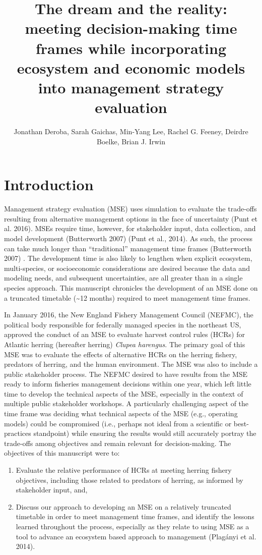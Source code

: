 \documentclass[]{article}
\title{The dream and the reality: meeting decision-making time frames while
incorporating ecosystem and economic models into management strategy
evaluation}
\author{Jonathan Deroba, Sarah Gaichas, Min-Yang Lee, Rachel G. Feeney, Deirdre
Boelke, Brian J. Irwin}
\date{}
\begin{document}
\maketitle

\doublespacing

\section{Introduction}\label{introduction}

Management strategy evaluation (MSE) uses simulation to evaluate the
trade-offs resulting from alternative management options in the face of
uncertainty (Punt et al. 2016). MSEs require time, however, for
stakeholder input, data collection, and model development (Butterworth
2007) (Punt et al., 2014). As such, the process can take much longer
than ``traditional'' management time frames (Butterworth 2007) . The
development time is also likely to lengthen when explicit ecosystem,
multi-species, or socioeconomic considerations are desired because the
data and modeling needs, and subsequent uncertainties, are all greater
than in a single species approach. This manuscript chronicles the
development of an MSE done on a truncated timetable (\textasciitilde{}12
months) required to meet management time frames.

In January 2016, the New England Fishery Management Council (NEFMC), the
political body responsible for federally managed species in the
northeast US, approved the conduct of an MSE to evaluate harvest control
rules (HCRs) for Atlantic herring (hereafter herring) \emph{Clupea
harengus}. The primary goal of this MSE was to evaluate the effects of
alternative HCRs on the herring fishery, predators of herring, and the
human environment. The MSE was also to include a public stakeholder
process. The NEFMC desired to have results from the MSE ready to inform
fisheries management decisions within one year, which left little time
to develop the technical aspects of the MSE, especially in the context
of multiple public stakeholder workshops. A particularly challenging
aspect of the time frame was deciding what technical aspects of the MSE
(e.g., operating models) could be compromised (i.e., perhaps not ideal
from a scientific or best-practices standpoint) while ensuring the
results would still accurately portray the trade-offs among objectives
and remain relevant for decision-making. The objectives of this
manuscript were to:

\begin{enumerate}
\def\labelenumi{\arabic{enumi}.}
\item
  Evaluate the relative performance of HCRs at meeting herring fishery
  objectives, including those related to predators of herring, as
  informed by stakeholder input, and,
\item
  Discuss our approach to developing an MSE on a relatively truncated
  timetable in order to meet management time frames, and identify the
  lessons learned throughout the process, especially as they relate to
  using MSE as a tool to advance an ecosystem based approach to
  management (Plagányi et al. 2014).
\end{enumerate}
\end{document}
